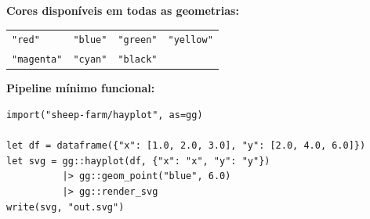 \documentclass[12pt, a4paper, oneside]{book}
\newcommand{\code}[1]{\texttt{#1}}
\begin{document}
\bigskip

\noindent\textbf{Cores disponíveis em todas as geometrias:}

\begin{center}
  \begin{tabular}{@{}llll@{}}
    \code{"red"}     & \code{"blue"}    & \code{"green"}   & \code{"yellow"} \\
    \code{"magenta"} & \code{"cyan"}    & \code{"black"}   & \\
  \end{tabular}
\end{center}

\bigskip

\noindent\textbf{Pipeline mínimo funcional:}

\begin{lstlisting}[caption={Menor script completo}]
import("sheep-farm/hayplot", as=gg)

let df = dataframe({"x": [1.0, 2.0, 3.0], "y": [2.0, 4.0, 6.0]})
let svg = gg::hayplot(df, {"x": "x", "y": "y"})
          |> gg::geom_point("blue", 6.0)
          |> gg::render_svg
write(svg, "out.svg")
\end{lstlisting}

\clearpage
\printindex
\end{document}
